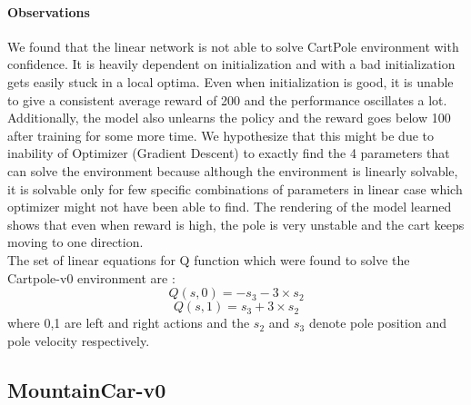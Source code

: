 \documentclass[12pt]{article}
\begin{document}
\paragraph{Observations} We found that the linear network is not able to solve CartPole environment with confidence. It is heavily dependent on initialization and with a bad initialization gets easily stuck in a local optima. Even when initialization is good, it is unable to give a consistent average reward of 200 and the performance oscillates a lot. Additionally, the model also unlearns the policy and the reward goes below 100 after training for some more time. We hypothesize that this might be due to inability of Optimizer (Gradient Descent) to exactly find the 4 parameters that can solve the environment because although the environment is linearly solvable, it is solvable only for few specific combinations of parameters in linear case which optimizer might not have been able to find. The rendering of the model learned shows that even when reward is high, the pole is very unstable and the cart keeps moving to one direction.\\
The set of linear equations for Q function which were found to solve the Cartpole-v0 environment are \cite{linearcart}:
$$ Q(s,0) = -s_3 - 3 \times s_2 $$
$$ Q(s,1) = s_3 + 3 \times s_2 $$
where 0,1 are left and right actions and the $s_2$ and $s_3$ denote pole position and pole velocity respectively.




\pagebreak[4]
\subsection*{MountainCar-v0}
\end{document}

